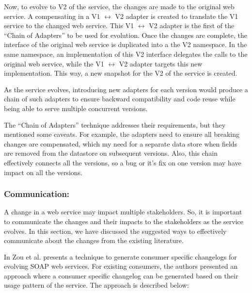\documentclass[runningheads,a4paper]{llncs}
\begin{document}
Now, to evolve to V2 of the service, the changes are made to the original web service. A compensating in a V1 $\leftrightarrow$ V2 adapter is created to translate the V1 service to the changed web service. This V1 $\leftrightarrow$ V2 adapter is the first of the ``Chain of Adapters'' to be used for evolution. Once the changes are complete, the interface of the original web service is duplicated into a the V2 namespace. In the same namespace, an implementation of this V2 interface delegates the calls to the original web service, while the V1 $\leftrightarrow$ V2 adapter targets this new implementation. This way, a new snapshot for the V2 of the service is created.

As the service evolves, introducing new adapters for each version would produce a chain of such adapters to ensure backward compatibility and code reuse while being able to serve multiple concurrent versions.

The ``Chain of Adapters'' technique addresses their requirements, but they mentioned some caveats. For example, the adapters need to ensure all breaking changes are compensated, which my need for a separate data store when fields are removed from the datastore on subsequent versions. Also, this chain effectively connects all the versions, so a bug or it’s fix on one version may have impact on all the versions.

\subsubsection{Communication:}
A change in a web service may impact multiple stakeholders. So, it is important to communicate the changes and their impacts to the stakeholders as the service evolves. In this section, we have discussed the suggested ways to effectively communicate about the changes from the existing literature.

In \cite{le2008synchronizing} Zou et al. presents a technique to generate consumer specific changelogs for evolving SOAP web services. For existing consumers, the authors presented an approach where a consumer specific changelog can be generated based on their usage pattern of the service. The approach is described below:
\end{document}
